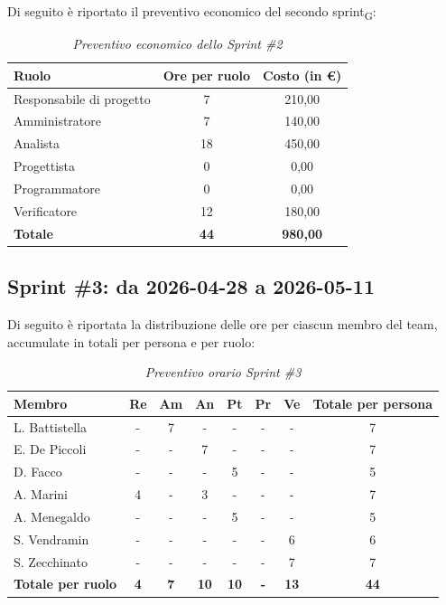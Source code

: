 ﻿\documentclass[a4paper, 10pt, colorlinks=true, linkcolor=black, urlcolor=blue, citecolor=blue, hidelinks]{article}
\renewcommand{\arraystretch}{1.2}
\begin{document}
Di seguito è riportato il preventivo economico del secondo sprint\textsubscript{G}:

\begin{table}[H]
    \centering
    \renewcommand{\arraystretch}{1.4}
    \begin{tabular}{|l|c|c|}
        \hline
        \rowcolor{bluBitless!15}
        \textbf{Ruolo} & \textbf{Ore per ruolo} & \textbf{Costo (in €)} \\
        \hline
        Responsabile di progetto & 7 & 210,00 \\ \hline
        Amministratore & 7 & 140,00 \\ \hline
        Analista & 18 & 450,00 \\ \hline
        Progettista & 0 & 0,00 \\ \hline
        Programmatore & 0 & 0,00 \\ \hline
        Verificatore & 12 & 180,00 \\ \hline
        \rowcolor{bluBitless!8}
        \textbf{Totale} & \textbf{44} & \textbf{980,00} \\ \hline
    \end{tabular}
    \caption{\textit{Preventivo economico dello Sprint \#2}}
\end{table}


\subsection{Sprint \#3: da 2026-04-28 a 2026-05-11}
Di seguito è riportata la distribuzione delle ore per ciascun membro del team,
accumulate in totali per persona e per ruolo:

\begin{table}[H]
    \centering
    \renewcommand{\arraystretch}{1.4}
    \begin{tabular}{|l|c|c|c|c|c|c|c|}
        \hline
        \rowcolor{bluBitless!15}
        \textbf{Membro} & \textbf{Re} & \textbf{Am} & \textbf{An} & \textbf{Pt} & \textbf{Pr} & \textbf{Ve} & \textbf{Totale per persona} \\
        \hline
        L. Battistella & - & 7 & - & - & - & - & 7 \\ \hline
        E. De Piccoli & - & - & 7 & - & - & - & 7 \\ \hline
        D. Facco & - & - & - & 5 & - & - & 5 \\ \hline
        A. Marini & 4 & - & 3 & - & - & - & 7 \\ \hline
        A. Menegaldo & - & - & - & 5 & - & - & 5 \\ \hline
        S. Vendramin & - & - & - & - & - & 6 & 6 \\ \hline
        S. Zecchinato & - & - & - & - & - & 7 & 7 \\ \hline
        \rowcolor{bluBitless!8}
        \textbf{Totale per ruolo} & \textbf{4} & \textbf{7} & \textbf{10} & \textbf{10} & \textbf{-} & \textbf{13} & \textbf{44} \\
        \hline
    \end{tabular}
    \caption{\textit{Preventivo orario Sprint \#3}}
\end{table}
\end{document}
